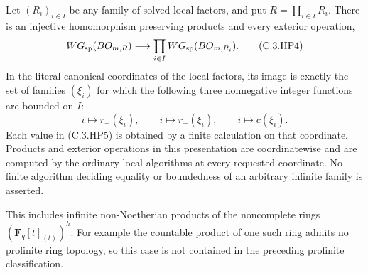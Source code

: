 \begin{theorem}
\label{C:henselian-products-WG}
Let $(R_i)_{i\in I}$ be any family of solved local factors,
and put $R=\prod_{i\in I}R_i$.
There is an injective homomorphism preserving products
and every exterior operation,
\[
 WG_{\rm sp}(BO_{m,R})\longrightarrow
                 \prod_{i\in I}WG_{\rm sp}(BO_{m,R_i}).   \tag{C.3.HP4}
\]
In the literal canonical coordinates of the local factors,
its image is exactly the set of families $(\xi_i)$ for
which the following three nonnegative integer functions
are bounded on $I$:
\[
              i\longmapsto r_+(\xi_i),\qquad
              i\longmapsto r_-(\xi_i),\qquad
              i\longmapsto c(\xi_i).                    \tag{C.3.HP5}
\]
Each value in (C.3.HP5) is obtained by a finite calculation
on that coordinate.  Products and exterior operations in
this presentation are coordinatewise and are computed
by the ordinary local algorithms at every requested
coordinate.  No finite algorithm deciding equality or
boundedness of an arbitrary infinite family is asserted.

This includes infinite non-Noetherian products of the
noncomplete rings $(\mathbf F_q[t]_{(t)})^h$.
For example the countable product of one such ring
admits no profinite ring topology, so this case is not
contained in the preceding profinite classification.
\end{theorem}
